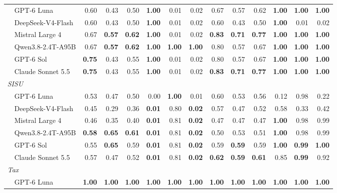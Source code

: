 \begin{table}[t]
\begin{tabular}{l@{\hspace{0.6em}}rrr@{\hspace{0.6em}}rrr@{\hspace{0.6em}}rrr@{\hspace{0.6em}}rrr}
  ~~GPT-6 Luna & 0.60 & 0.43 & 0.50 & \textbf{1.00} & 0.01 & 0.02 & 0.67 & 0.57 & 0.62 & \textbf{1.00} & \textbf{1.00} & \textbf{1.00} \\
  ~~DeepSeek-V4-Flash & 0.60 & 0.43 & 0.50 & \textbf{1.00} & 0.01 & 0.02 & 0.60 & 0.43 & 0.50 & \textbf{1.00} & 0.01 & 0.02 \\
  ~~Mistral Large 4 & 0.67 & \textbf{0.57} & \textbf{0.62} & \textbf{1.00} & 0.01 & 0.02 & \textbf{0.83} & \textbf{0.71} & \textbf{0.77} & \textbf{1.00} & \textbf{1.00} & \textbf{1.00} \\
  ~~Qwen3.8-2.4T-A95B & 0.67 & \textbf{0.57} & \textbf{0.62} & \textbf{1.00} & \textbf{1.00} & \textbf{1.00} & 0.80 & 0.57 & 0.67 & \textbf{1.00} & \textbf{1.00} & \textbf{1.00} \\
  ~~GPT-6 Sol & \textbf{0.75} & 0.43 & 0.55 & \textbf{1.00} & 0.01 & 0.02 & 0.80 & 0.57 & 0.67 & \textbf{1.00} & \textbf{1.00} & \textbf{1.00} \\
  ~~Claude Sonnet 5.5 & \textbf{0.75} & 0.43 & 0.55 & \textbf{1.00} & 0.01 & 0.02 & \textbf{0.83} & \textbf{0.71} & \textbf{0.77} & \textbf{1.00} & \textbf{1.00} & \textbf{1.00} \\
  \midrule
  \multicolumn{13}{l}{\textit{SISU}} \\
  ~~GPT-6 Luna & 0.53 & 0.47 & 0.50 & 0.00 & \textbf{1.00} & 0.01 & 0.60 & 0.53 & 0.56 & 0.12 & 0.98 & 0.22 \\
  ~~DeepSeek-V4-Flash & 0.45 & 0.29 & 0.36 & \textbf{0.01} & 0.80 & \textbf{0.02} & 0.57 & 0.47 & 0.52 & 0.58 & 0.33 & 0.42 \\
  ~~Mistral Large 4 & 0.46 & 0.35 & 0.40 & \textbf{0.01} & 0.81 & \textbf{0.02} & 0.47 & 0.47 & 0.47 & \textbf{1.00} & 0.98 & 0.99 \\
  ~~Qwen3.8-2.4T-A95B & \textbf{0.58} & \textbf{0.65} & \textbf{0.61} & \textbf{0.01} & 0.81 & \textbf{0.02} & 0.50 & 0.53 & 0.51 & \textbf{1.00} & 0.98 & 0.99 \\
  ~~GPT-6 Sol & 0.55 & \textbf{0.65} & 0.59 & \textbf{0.01} & 0.81 & \textbf{0.02} & 0.59 & \textbf{0.59} & 0.59 & \textbf{1.00} & \textbf{0.99} & \textbf{1.00} \\
  ~~Claude Sonnet 5.5 & 0.57 & 0.47 & 0.52 & \textbf{0.01} & 0.81 & \textbf{0.02} & \textbf{0.62} & \textbf{0.59} & \textbf{0.61} & 0.85 & \textbf{0.99} & 0.92 \\
  \midrule
  \multicolumn{13}{l}{\textit{Tax}} \\
  ~~GPT-6 Luna & \textbf{1.00} & \textbf{1.00} & \textbf{1.00} & \textbf{1.00} & \textbf{1.00} & \textbf{1.00} & \textbf{1.00} & \textbf{1.00} & \textbf{1.00} & \textbf{1.00} & \textbf{1.00} & \textbf{1.00} \\

\end{tabular}
\end{table}
